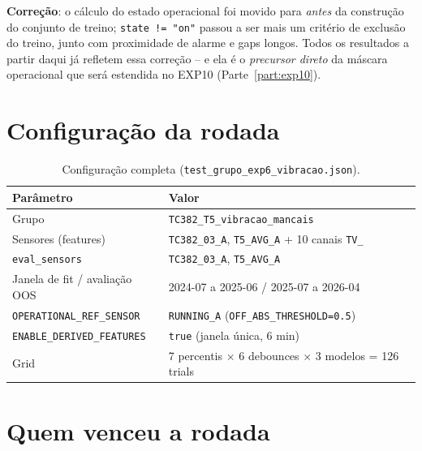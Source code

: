 \documentclass[11pt,a4paper]{article}
\begin{document}
\textbf{Correção}: o cálculo do estado operacional foi movido para
\emph{antes} da construção do conjunto de treino; \texttt{state != "on"}
passou a ser mais um critério de exclusão do treino, junto com proximidade
de alarme e gaps longos. Todos os resultados a partir daqui já refletem
essa correção -- e ela é o \emph{precursor direto} da máscara operacional
que será estendida no EXP10 (Parte~\ref{part:exp10}).

\section{Configuração da rodada}

\begin{table}[H]
\centering
\small
\begin{tabular}{@{}ll@{}}
\toprule
\textbf{Parâmetro} & \textbf{Valor} \\
\midrule
Grupo & \texttt{TC382\_T5\_vibracao\_mancais} \\
Sensores (features) & \texttt{TC382\_03\_A}, \texttt{T5\_AVG\_A} + 10 canais \texttt{TV\_} \\
\texttt{eval\_sensors} & \texttt{TC382\_03\_A}, \texttt{T5\_AVG\_A} \\
Janela de fit / avaliação OOS & 2024-07 a 2025-06 / 2025-07 a 2026-04 \\
\texttt{OPERATIONAL\_REF\_SENSOR} & \texttt{RUNNING\_A} (\texttt{OFF\_ABS\_THRESHOLD=0.5}) \\
\texttt{ENABLE\_DERIVED\_FEATURES} & \texttt{true} (janela única, 6 min) \\
Grid & 7 percentis $\times$ 6 debounces $\times$ 3 modelos = 126 trials \\
\bottomrule
\end{tabular}
\caption{Configuração completa (\texttt{test\_grupo\_exp6\_vibracao.json}).}
\end{table}

\section{Quem venceu a rodada}
\end{document}
